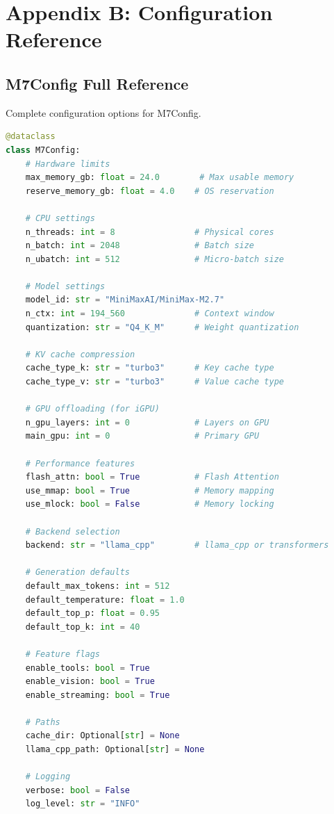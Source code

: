 \section{Appendix B: Configuration Reference}
\label{appendix:config}

\subsection{M7Config Full Reference}

Complete configuration options for M7Config.

\begin{lstlisting}[language=Python, caption=Complete M7Config Options]
@dataclass
class M7Config:
    # Hardware limits
    max_memory_gb: float = 24.0        # Max usable memory
    reserve_memory_gb: float = 4.0    # OS reservation
    
    # CPU settings
    n_threads: int = 8                # Physical cores
    n_batch: int = 2048               # Batch size
    n_ubatch: int = 512               # Micro-batch size
    
    # Model settings
    model_id: str = "MiniMaxAI/MiniMax-M2.7"
    n_ctx: int = 194_560              # Context window
    quantization: str = "Q4_K_M"      # Weight quantization
    
    # KV cache compression
    cache_type_k: str = "turbo3"      # Key cache type
    cache_type_v: str = "turbo3"      # Value cache type
    
    # GPU offloading (for iGPU)
    n_gpu_layers: int = 0             # Layers on GPU
    main_gpu: int = 0                 # Primary GPU
    
    # Performance features
    flash_attn: bool = True           # Flash Attention
    use_mmap: bool = True             # Memory mapping
    use_mlock: bool = False           # Memory locking
    
    # Backend selection
    backend: str = "llama_cpp"        # llama_cpp or transformers
    
    # Generation defaults
    default_max_tokens: int = 512
    default_temperature: float = 1.0
    default_top_p: float = 0.95
    default_top_k: int = 40
    
    # Feature flags
    enable_tools: bool = True
    enable_vision: bool = True
    enable_streaming: bool = True
    
    # Paths
    cache_dir: Optional[str] = None
    llama_cpp_path: Optional[str] = None
    
    # Logging
    verbose: bool = False
    log_level: str = "INFO"
\end{lstlisting}

